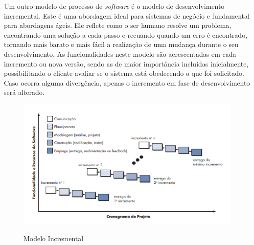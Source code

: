 Um outro modelo de processo de \textit{software} é o modelo de desenvolvimento incremental. Este é uma abordagem ideal para sistemas de negócio e fundamental para abordagens ágeis. Ele reflete como o ser humano resolve um problema, encontrando uma solução a cada passo e recuando quando um erro é encontrado, tornando mais barato e mais fácil a realização de uma mudança durante o seu desenvolvimento. As funcionalidades neste modelo são acrescentadas em cada incremento ou nova versão, sendo as de maior importância incluídas inicialmente, possibilitando o cliente avaliar se o sistema está obedecendo o que foi solicitado. Caso ocorra alguma divergência, apenas o incremento em fase de desenvolvimento será alterado.

\begin{figure}[!htb]
    \centering
    \caption{Modelo Incremental}
    \includegraphics[width=1\textwidth]{./dados/figuras/modeloIncremental}
    \label{fig:figura-modelo-incremental}
\end{figure}
